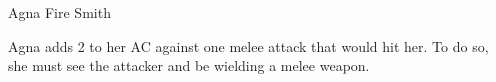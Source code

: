 \begin{DndMonster}{Agna Fire Smith}
\begin{multicols}{2}
        \DndMonsterMelee[
            name=Unarmed Strike,
            mod=+8,
            dmg=5,
            dmg-type=bludgeoning
        ]


        Agna adds 2 to her AC against one melee attack that would hit her.
        To do so, she must see the attacker and be wielding a melee weapon.







    \end{multicols}
\end{DndMonster}
